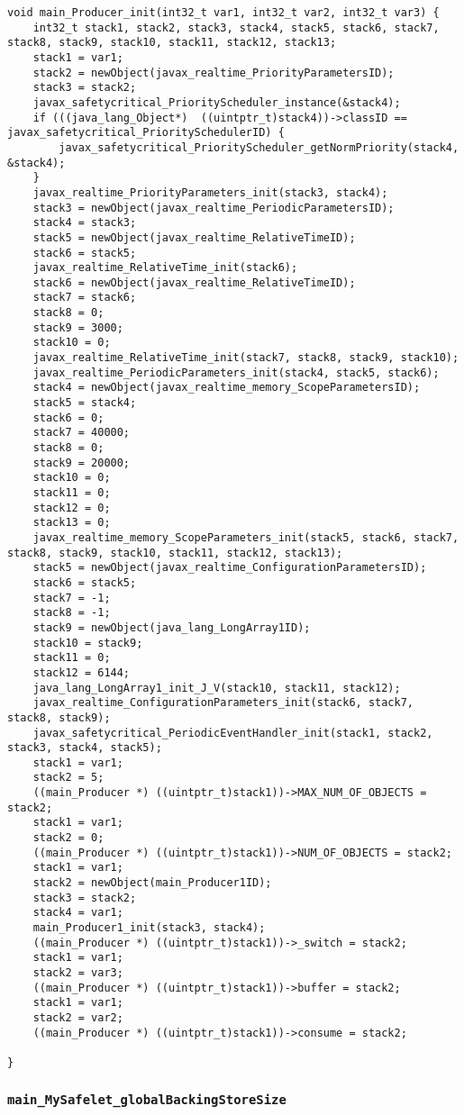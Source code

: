 \begin{landscape}
\begin{multicols}{2}
\begin{lstlisting}[firstnumber=224]
void main_Producer_init(int32_t var1, int32_t var2, int32_t var3) {
	int32_t stack1, stack2, stack3, stack4, stack5, stack6, stack7, stack8, stack9, stack10, stack11, stack12, stack13;
	stack1 = var1;
	stack2 = newObject(javax_realtime_PriorityParametersID);
	stack3 = stack2;
	javax_safetycritical_PriorityScheduler_instance(&stack4);
	if (((java_lang_Object*)  ((uintptr_t)stack4))->classID == javax_safetycritical_PrioritySchedulerID) {
		javax_safetycritical_PriorityScheduler_getNormPriority(stack4, &stack4);
	}
	javax_realtime_PriorityParameters_init(stack3, stack4);
	stack3 = newObject(javax_realtime_PeriodicParametersID);
	stack4 = stack3;
	stack5 = newObject(javax_realtime_RelativeTimeID);
	stack6 = stack5;
	javax_realtime_RelativeTime_init(stack6);
	stack6 = newObject(javax_realtime_RelativeTimeID);
	stack7 = stack6;
	stack8 = 0;
	stack9 = 3000;
	stack10 = 0;
	javax_realtime_RelativeTime_init(stack7, stack8, stack9, stack10);
	javax_realtime_PeriodicParameters_init(stack4, stack5, stack6);
	stack4 = newObject(javax_realtime_memory_ScopeParametersID);
	stack5 = stack4;
	stack6 = 0;
	stack7 = 40000;
	stack8 = 0;
	stack9 = 20000;
	stack10 = 0;
	stack11 = 0;
	stack12 = 0;
	stack13 = 0;
	javax_realtime_memory_ScopeParameters_init(stack5, stack6, stack7, stack8, stack9, stack10, stack11, stack12, stack13);
	stack5 = newObject(javax_realtime_ConfigurationParametersID);
	stack6 = stack5;
	stack7 = -1;
	stack8 = -1;
	stack9 = newObject(java_lang_LongArray1ID);
	stack10 = stack9;
	stack11 = 0;
	stack12 = 6144;
	java_lang_LongArray1_init_J_V(stack10, stack11, stack12);
	javax_realtime_ConfigurationParameters_init(stack6, stack7, stack8, stack9);
	javax_safetycritical_PeriodicEventHandler_init(stack1, stack2, stack3, stack4, stack5);
	stack1 = var1;
	stack2 = 5;
	((main_Producer *) ((uintptr_t)stack1))->MAX_NUM_OF_OBJECTS = stack2;
	stack1 = var1;
	stack2 = 0;
	((main_Producer *) ((uintptr_t)stack1))->NUM_OF_OBJECTS = stack2;
	stack1 = var1;
	stack2 = newObject(main_Producer1ID);
	stack3 = stack2;
	stack4 = var1;
	main_Producer1_init(stack3, stack4);
	((main_Producer *) ((uintptr_t)stack1))->_switch = stack2;
	stack1 = var1;
	stack2 = var3;
	((main_Producer *) ((uintptr_t)stack1))->buffer = stack2;
	stack1 = var1;
	stack2 = var2;
	((main_Producer *) ((uintptr_t)stack1))->consume = stack2;

}
\end{lstlisting}

\subsubsection{\texttt{main\_MySafelet\_globalBackingStoreSize}}


\end{multicols}
\end{landscape}
